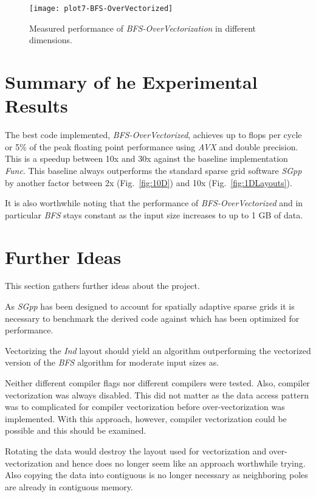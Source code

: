 \documentclass[letterpaper]{article}
\begin{document}
			\begin{figure}[htbp]\centering
				\texttt{[image: plot7-BFS-OverVectorized]}
				\caption{Measured performance of \emph{BFS-OverVectorization} in different dimensions.}
				\label{fig:BFSOver}
			\end{figure}





	\section{Summary of he Experimental Results}

	The best code implemented, \emph{BFS-OverVectorized}, achieves up to  flops per cycle or 5\% of the peak floating point performance using \emph{AVX} and double precision. This is a speedup between 10x and 30x against the baseline implementation \emph{Func}. This baseline always outperforms the standard sparse grid software \emph{SGpp} by another factor between 2x  (Fig.~\ref{fig:10D}) and 10x (Fig.~\ref{fig:1DLayouts}).

	It is also worthwhile noting that the performance of \emph{BFS-OverVectorized} and in particular \emph{BFS} stays constant as the input size increases to up to 1 GB of data.






	
	\section{Further Ideas}
		This section gathers further ideas about the project.
		
		As \emph{SGpp} has been designed to account for spatially adaptive sparse grids it is necessary to benchmark the derived code against \cite{buse12non-static} which has been optimized for performance.

		Vectorizing the \emph{Ind} layout should yield an algorithm outperforming the vectorized version of the \emph{BFS} algorithm for moderate input sizes as.

		Neither different compiler flags nor different compilers were tested. Also, compiler vectorization was always disabled. This did not matter as the data access pattern was to complicated for compiler vectorization before over-vectorization was implemented. With this approach, however, compiler vectorization could be possible and this should be examined. 

		Rotating the data would destroy the layout used for vectorization and over-vectorization and hence does no longer seem like an approach worthwhile trying. Also copying the data into contiguous is no longer necessary as neighboring poles are already in contiguous memory.




	


	
\end{document}
